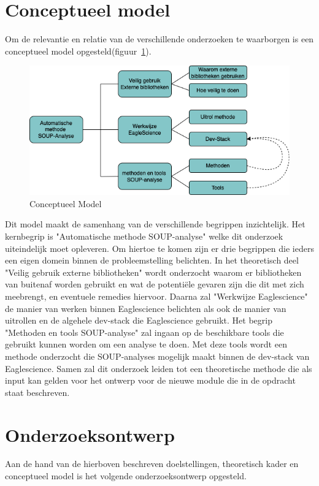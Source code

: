 \section{Conceptueel model}\label{sec:conceptueel-model}
Om de relevantie en relatie van de verschillende onderzoeken te waarborgen is een conceptueel model opgesteld(figuur~\ref{fig:ConceptueelModel}).
\begin{figure}
    \centering
    \includegraphics[width=12cm]{gfx/Conceptueel Model}
    \caption{Conceptueel Model}
    \label{fig:ConceptueelModel}
\end{figure}
Dit model maakt de samenhang van de verschillende begrippen inzichtelijk. Het kernbegrip is "Automatische methode SOUP-analyse" welke dit onderzoek uiteindelijk moet opleveren. Om hiertoe te komen zijn er drie begrippen die ieders een eigen domein binnen de probleemstelling belichten. In het theoretisch deel "Veilig gebruik externe bibliotheken"  wordt onderzocht waarom er bibliotheken van buitenaf worden gebruikt en wat de potentiële gevaren zijn die dit met zich meebrengt, en eventuele remedies hiervoor. Daarna zal "Werkwijze Eaglescience"  de manier van werken binnen Eaglescience belichten als ook de manier van uitrollen en de algehele dev-stack die Eaglescience gebruikt. Het begrip "Methoden en tools SOUP-analyse" zal ingaan op de beschikbare tools die gebruikt kunnen worden om een analyse te doen. Met deze tools wordt een methode onderzocht die SOUP-analyses mogelijk maakt binnen de dev-stack van Eaglescience. Samen zal dit onderzoek leiden tot een theoretische methode die als input kan gelden voor het ontwerp voor de nieuwe module die in de opdracht staat beschreven.

\section{Onderzoeksontwerp}\label{sec:OP_onderzoeksontwerp}
Aan de hand van de hierboven beschreven doelstellingen, theoretisch kader en conceptueel model is het volgende onderzoeksontwerp opgesteld.

